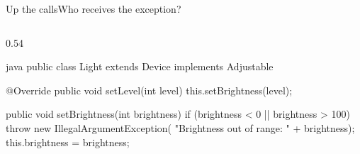 \documentclass[\deckoptions]{beamer}
\begin{document}
\begin{frame}[fragile]{Up the calls}{Who receives the exception?}
  \begin{columns}[T, onlytextwidth]
    \begin{column}{0.54\textwidth}
\begin{codeblock}[steps={none|4|9-10|4|none|}, dense, marks={4/2/info/1, 9-10/3/error, 4/4}]{java}
public class Light extends Device implements Adjustable {
    @Override
    public void setLevel(int level) {
        this.setBrightness(level);
    }

    public void setBrightness(int brightness) {
        if (brightness < 0 || brightness > 100) {
            throw new IllegalArgumentException(
                    "Brightness out of range: " + brightness);
        }
        this.brightness = brightness;
    }

}
\end{codeblock}
\end{column}
\end{columns}
\end{frame}
\end{document}
